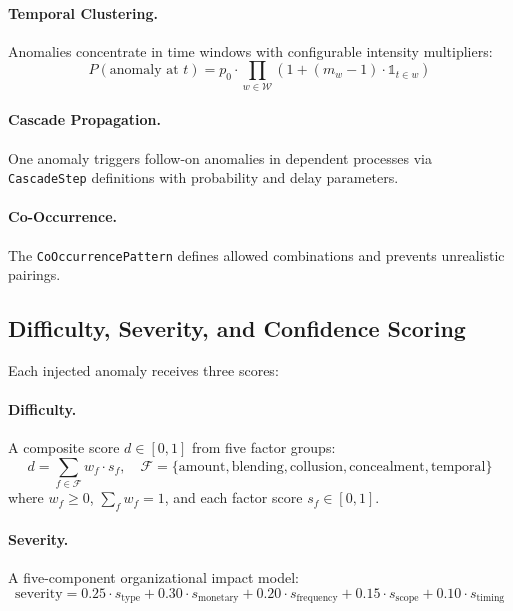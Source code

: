 \paragraph{Temporal Clustering.}
Anomalies concentrate in time windows with configurable intensity
multipliers:
\begin{equation}
P(\text{anomaly at } t) = p_0 \cdot
  \prod_{w \in \mathcal{W}} \left(1 + (m_w - 1) \cdot
  \mathbb{1}_{t \in w}\right)
\end{equation}

\paragraph{Cascade Propagation.}
One anomaly triggers follow-on anomalies in dependent processes via
\texttt{CascadeStep} definitions with probability and delay parameters.

\paragraph{Co-Occurrence.}
The \texttt{CoOccurrencePattern} defines allowed combinations and
prevents unrealistic pairings.

\subsection{Difficulty, Severity, and Confidence Scoring}
\label{sec:anom_scoring}

Each injected anomaly receives three scores:

\paragraph{Difficulty.}
A composite score $d \in [0, 1]$ from five factor groups:
\begin{equation}
d = \sum_{f \in \mathcal{F}} w_f \cdot s_f, \quad
\mathcal{F} = \{\text{amount}, \text{blending}, \text{collusion},
  \text{concealment}, \text{temporal}\}
\label{eq:difficulty}
\end{equation}
where $w_f \geq 0$, $\sum_f w_f = 1$, and each factor score
$s_f \in [0, 1]$.

\paragraph{Severity.}
A five-component organizational impact model:
\begin{equation}
\text{severity} = 0.25 \cdot s_{\text{type}} + 0.30 \cdot s_{\text{monetary}}
  + 0.20 \cdot s_{\text{frequency}} + 0.15 \cdot s_{\text{scope}}
  + 0.10 \cdot s_{\text{timing}}
\label{eq:severity}
\end{equation}

